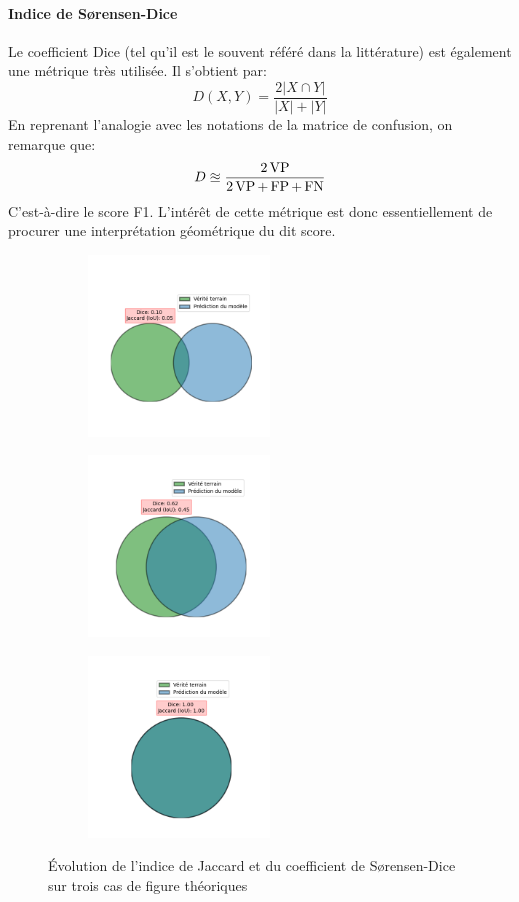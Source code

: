\paragraph{Indice de Sørensen-Dice} Le coefficient Dice (tel qu'il est le souvent référé dans la littérature) est également une métrique très utilisée. Il s'obtient par:
\begin{equation}
	D(X, Y) = \frac{2|X \cap Y|}{|X| + |Y|}
\end{equation}
En reprenant l'analogie avec les notations de la matrice de confusion, on remarque que:
\begin{equation}
	D \approxeq \frac{2 \operatorname{VP}}{2\operatorname{VP} + \operatorname{FP} + \operatorname{FN}}
\end{equation}
C'est-à-dire le score F1. L'intérêt de cette métrique est donc essentiellement de procurer une interprétation géométrique du dit score.

\begin{figure}[!h]
	\centering
	\begin{subfigure}{.3\textwidth}
		\includegraphics[height=13em]{gnuplot/revue_litterature/dice/bad_dice}
		\caption{}
	\end{subfigure}
	\begin{subfigure}{.3\textwidth}
		\includegraphics[height=13em]{gnuplot/revue_litterature/dice/mid_dice}
		\caption{}
		\label{fig:midDiceExemple}
	\end{subfigure}
	\begin{subfigure}{.3\textwidth}
		\includegraphics[height=13em]{gnuplot/revue_litterature/dice/perfect_dice}
		\caption{}
	\end{subfigure}
\caption{Évolution de l'indice de Jaccard et du coefficient de Sørensen-Dice sur trois cas de figure théoriques}
\label{fig:DiceJaccardExemple}
\end{figure}

